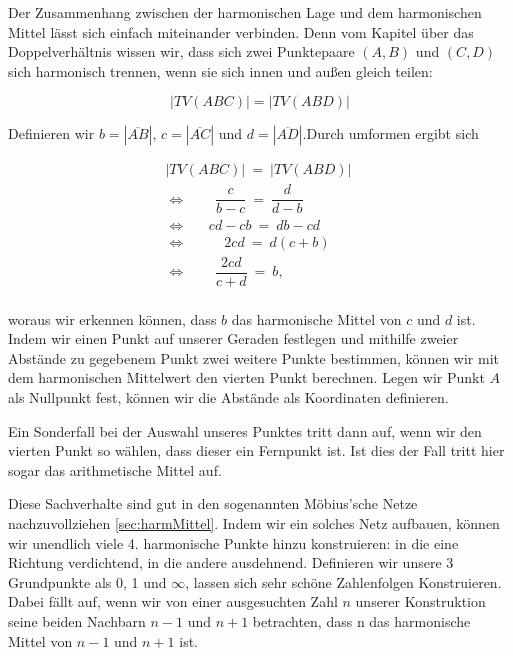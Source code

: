\documentclass[12pt,a4paper]{article}
\begin{document}
Der Zusammenhang zwischen der harmonischen Lage und dem harmonischen Mittel lässt sich einfach miteinander verbinden. Denn vom Kapitel über das Doppelverhältnis wissen wir, dass sich zwei Punktepaare $(A, B)$ und $(C, D)$ sich harmonisch trennen, wenn sie sich innen und außen gleich teilen:

\[|TV(A B C)| = |TV(A B D)|\]

Definieren wir $b = |\overline{A B}|$, $c = |\overline{A C}|$ und $d = |\overline{A D}|$.Durch umformen ergibt sich

\begin{equation*}
\begin{split}
|TV(A B C)|~=~|TV(A B D)| ~\\
\Longleftrightarrow ~~~~~~~~~\dfrac{c}{b-c}~=~\dfrac{d}{d-b}~~~~~~~~~~\\
\Longleftrightarrow ~~~~~~~cd-cb~=~db-cd~~~~~~~~\\
\Longleftrightarrow ~~~~~~~~~~~~2 cd~=~d (c+b)~~~~~~~\\
\Longleftrightarrow ~~~~~~~~~\dfrac{2cd}{c+d}~=~b,~~~~~~~~~~~~~~~\\
\end{split}
\end{equation*}

woraus wir erkennen können, dass $b$ das harmonische Mittel von $c$ und $d$ ist. Indem wir einen Punkt auf unserer Geraden festlegen und mithilfe zweier Abstände zu gegebenem Punkt zwei weitere Punkte bestimmen, können wir mit dem harmonischen Mittelwert den vierten Punkt berechnen. Legen wir Punkt $A$ als Nullpunkt fest, können wir die Abstände als Koordinaten definieren.

Ein Sonderfall bei der Auswahl unseres Punktes tritt dann auf, wenn wir den vierten Punkt so wählen, dass dieser ein Fernpunkt ist. Ist dies der Fall tritt hier sogar das arithmetische Mittel auf.

Diese Sachverhalte sind gut in den sogenannten Möbius'sche Netze nachzuvollziehen \ref{sec:harmMittel}. Indem wir ein solches Netz aufbauen, können wir unendlich viele 4. harmonische Punkte hinzu konstruieren: in die eine Richtung verdichtend, in die andere ausdehnend. Definieren wir unsere 3 Grundpunkte als 0, 1 und $\infty$, lassen sich sehr schöne Zahlenfolgen Konstruieren. Dabei fällt auf, wenn wir von einer ausgesuchten Zahl $n$ unserer Konstruktion seine beiden Nachbarn $n-1$ und $n+1$ betrachten, dass n das harmonische Mittel von $n-1$ und $n+1$ ist.
\end{document}
